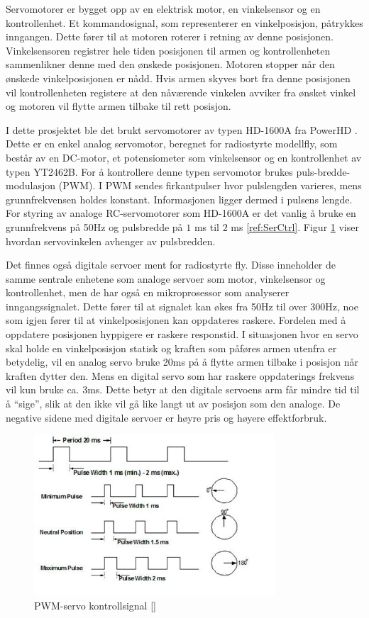 Servomotorer er bygget opp av en elektrisk motor, en vinkelsensor og en kontrollenhet. Et kommandosignal, som representerer en vinkelposisjon, påtrykkes inngangen. Dette fører til at motoren roterer i retning av denne posisjonen. Vinkelsensoren registrer hele tiden posisjonen til armen og kontrollenheten sammenlikner denne med den ønskede posisjonen. Motoren stopper når den ønskede vinkelposisjonen er nådd. Hvis armen skyves bort fra denne posisjonen vil kontrollenheten registere at den nåværende vinkelen avviker fra ønsket vinkel og motoren vil flytte armen tilbake til rett posisjon. 

I dette prosjektet ble det brukt servomotorer av typen HD-1600A fra PowerHD \cite{PowerHD}. Dette er en enkel analog servomotor, beregnet for radiostyrte modellfly, som består av en DC-motor, et potensiometer som vinkelsensor og en kontrollenhet av typen YT2462B. For å kontrollere denne typen servomotor brukes puls-bredde-modulasjon (PWM). I PWM sendes firkantpulser hvor pulslengden varieres, mens grunnfrekvensen holdes konstant. Informasjonen ligger dermed i pulsens lengde. For styring av analoge RC-servomotorer som HD-1600A er det vanlig å bruke en grunnfrekvens på 50Hz og pulsbredde på $1$ ms til $2$ ms \ref{ref:SerCtrl}. Figur \ref{fig:PWM} viser hvordan servovinkelen avhenger av pulsbredden.

Det finnes også digitale servoer ment for radiostyrte fly. Disse inneholder de samme sentrale enhetene som analoge servoer som motor, vinkelsensor og kontrollenhet, men de har også en mikroprosessor som analyserer inngangssignalet. Dette fører til at signalet kan økes fra 50Hz til over 300Hz, noe som igjen fører til at vinkelposisjonen kan oppdateres raskere. Fordelen med å oppdatere posisjonen hyppigere er raskere responstid. I situasjonen hvor en servo skal holde en vinkelposisjon statisk og kraften som påføres armen utenfra er betydelig, vil en analog servo bruke 20ms på å flytte armen tilbake i posisjon når kraften dytter den. Mens en digital servo som har raskere oppdaterings frekvens vil kun bruke ca. 3ms. Dette betyr at den digitale servoens arm får mindre tid til å ``sige'', slik at den ikke vil gå like langt ut av posisjon som den analoge. De negative sidene med digitale servoer er høyre pris og høyere effektforbruk.    

\begin{figure}[H]
\centering
\includegraphics[width=0.8\textwidth]{img/pwm_servo.jpg}
\caption{PWM-servo kontrollsignal [\cite{PWM}]}
\label{fig:PWM}
\end{figure}   

